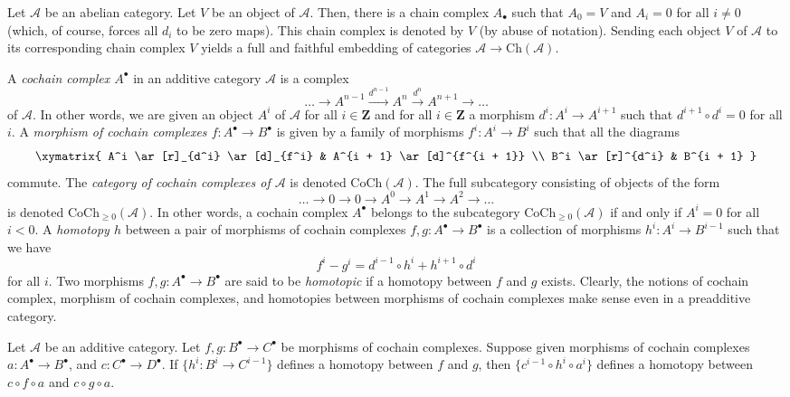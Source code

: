 \begin{definition}
\label{definition-skyscraper-complex}
Let $\mathcal{A}$ be an abelian category.
Let $V$ be an object of $\mathcal{A}$.
Then, there is a chain complex $A_\bullet$ such
that $A_0 = V$ and $A_i = 0$ for all $i \neq 0$
(which, of course, forces all $d_i$ to be zero maps).
This chain complex is denoted by $V$ (by abuse of
notation).
Sending each object $V$ of $\mathcal{A}$ to its
corresponding chain complex $V$ yields a full and
faithful embedding of categories
$\mathcal{A} \to \text{Ch}(\mathcal{A})$.
\end{definition}

\noindent
A {\it cochain complex $A^\bullet$} in an additive category $\mathcal{A}$
is a complex
$$
\ldots \to
A^{n - 1} \xrightarrow{d^{n - 1}}
A^n \xrightarrow{d^n}
A^{n + 1} \to
\ldots
$$
of $\mathcal{A}$. In other words, we are given an object $A^i$ of
$\mathcal{A}$ for all $i \in \mathbf{Z}$ and for
all $i \in \mathbf{Z}$ a morphism $d^i : A^i \to A^{i + 1}$ such that
$d^{i + 1} \circ d^i = 0$ for all $i$. A {\it morphism of cochain
complexes $f : A^\bullet \to B^\bullet$} is given by a
family of morphisms $f^i : A^i \to B^i$ such that all
the diagrams
$$
\xymatrix{
A^i \ar[r]_{d^i} \ar[d]_{f^i} & A^{i + 1} \ar[d]^{f^{i + 1}} \\
B^i \ar[r]^{d^i} & B^{i + 1}
}
$$
commute. The {\it category of cochain complexes of $\mathcal{A}$}
is denoted $\text{CoCh}(\mathcal{A})$. The full subcategory consisting
of objects of the form
$$
\ldots \to 0 \to 0 \to A^0 \to A^1 \to A^2 \to \ldots
$$
is denoted $\text{CoCh}_{\geq 0}(\mathcal{A})$.
In other words, a cochain complex $A^\bullet$ belongs to the subcategory
$\text{CoCh}_{\geq 0}(\mathcal{A})$ if and only if
$A^i = 0$ for all $i < 0$.
A {\it homotopy $h$} between a pair of morphisms
of cochain complexes $f, g : A^\bullet \to B^\bullet$
is a collection of morphisms $h^i : A^i \to B^{i - 1}$
such that we have
$$
f^i - g^i = d^{i - 1} \circ h^i + h^{i + 1} \circ d^i
$$
for all $i$.
Two morphisms $f, g : A^\bullet \to B^\bullet$ are
said to be {\it homotopic} if a homotopy between $f$
and $g$ exists.
Clearly, the notions of cochain complex, morphism of
cochain complexes, and homotopies between morphisms of cochain complexes
make sense even in a preadditive category.

\begin{lemma}
\label{lemma-compose-homotopy-cochain}
Let $\mathcal{A}$ be an additive category.
Let $f, g : B^\bullet \to C^\bullet$ be morphisms
of cochain complexes. Suppose given morphisms of cochain
complexes $a : A^\bullet \to B^\bullet$, and
$c : C^\bullet \to D^\bullet$.
If $\{h^i : B^i \to C^{i - 1}\}$ defines a homotopy
between $f$ and $g$, then $\{c^{i - 1} \circ h^i \circ a^i\}$
defines a homotopy between $c \circ f \circ a$ and
$c \circ g \circ a$.
\end{lemma}

